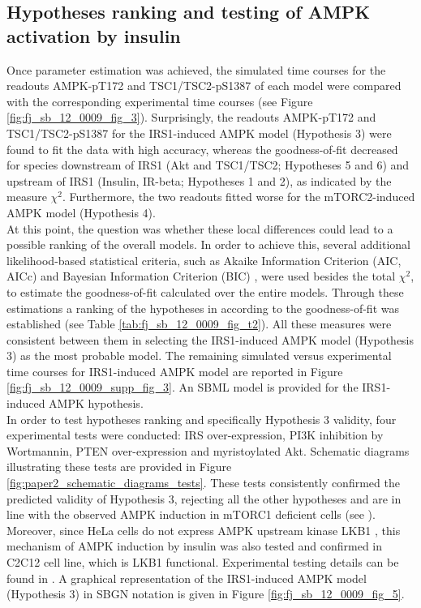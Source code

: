 \subsection{Hypotheses ranking and testing of AMPK activation by insulin}
\label{paper2-subsec:Hypotheses ranking and testing of AMPK activation by insulin}
Once parameter estimation was achieved, the simulated time courses for the readouts AMPK-pT172 and TSC1/TSC2-pS1387 of each model were compared with the corresponding experimental time courses (see Figure \ref{fig:fj_sb_12_0009_fig_3}). Surprisingly, the readouts AMPK-pT172 and TSC1/TSC2-pS1387 for the IRS1-induced AMPK model (Hypothesis 3) were found to fit the data with high accuracy, whereas the goodness-of-fit decreased for species downstream of IRS1 (Akt and TSC1/TSC2; Hypotheses 5 and 6) and upstream of IRS1 (Insulin, IR-beta; Hypotheses 1 and 2), as indicated by the measure $\chi^2$. Furthermore, the two readouts fitted worse for the mTORC2-induced AMPK model (Hypothesis 4). \\
At this point, the question was whether these local differences could lead to a possible ranking of the overall models. In order to achieve this, several additional likelihood-based statistical criteria, such as Akaike Information Criterion (AIC, AICc) \citep{Akaike1973} and Bayesian Information Criterion (BIC) \citep{Schwarz1978}, were used besides the total $\chi^2$, to estimate the goodness-of-fit calculated over the entire models. Through these estimations a ranking of the hypotheses in according to the goodness-of-fit was established (see Table \ref{tab:fj_sb_12_0009_fig_t2}). All these measures were consistent between them in selecting the IRS1-induced AMPK model (Hypothesis 3) as the most probable model. The remaining simulated versus experimental time courses for IRS1-induced AMPK model are reported in Figure \ref{fig:fj_sb_12_0009_supp_fig_3}. An SBML model is provided for the IRS1-induced AMPK hypothesis.\\
In order to test hypotheses ranking and specifically Hypothesis 3 validity, four experimental tests were conducted: IRS over-expression, PI3K inhibition by Wortmannin, PTEN over-expression and myristoylated Akt. Schematic diagrams illustrating these tests are provided in Figure \ref{fig:paper2_schematic_diagrams_tests}. These tests consistently confirmed the predicted validity of Hypothesis 3, rejecting all the other hypotheses and are in line with the observed AMPK induction in mTORC1 deficient cells (see \citep{Aguilar2007, Polak2008}). Moreover, since HeLa cells do not express AMPK upstream kinase LKB1 \citep{Suzuki2004,Sun2007}, this mechanism of AMPK induction by insulin was also tested and confirmed in C2C12 cell line, which is LKB1 functional. Experimental testing details can be found in \citep[Fig. 4]{Sonntag2012}. A graphical representation of the IRS1-induced AMPK model (Hypothesis 3) in SBGN notation is given in Figure \ref{fig:fj_sb_12_0009_fig_5}.

